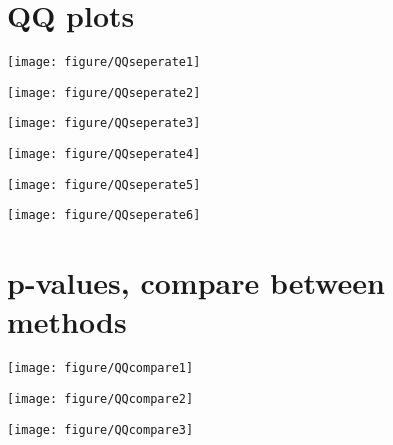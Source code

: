 \documentclass{article}\usepackage[]{graphicx}\usepackage[]{color}
\makeatletter
\def\maxwidth{ %
  \ifdim\Gin@nat@width>\linewidth
    \linewidth
  \else
    \Gin@nat@width
  \fi
}
\newenvironment{knitrout}{}{} %
\makeatother
\begin{document}

\section*{QQ plots}
\begin{knitrout}
\color{fgcolor}
\texttt{[image: figure/QQseperate1]} 

\texttt{[image: figure/QQseperate2]} 

\texttt{[image: figure/QQseperate3]} 

\texttt{[image: figure/QQseperate4]} 

\texttt{[image: figure/QQseperate5]} 

\texttt{[image: figure/QQseperate6]} 

\end{knitrout}

\section*{p-values, compare between methods}
\begin{knitrout}
\color{fgcolor}
\texttt{[image: figure/QQcompare1]} 

\texttt{[image: figure/QQcompare2]} 

\texttt{[image: figure/QQcompare3]} 

\end{knitrout}


\end{document}
